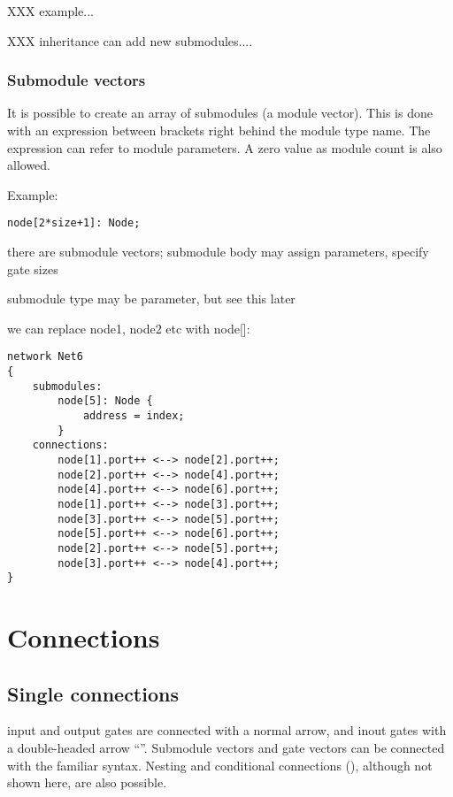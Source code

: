 XXX example...

XXX inheritance can add new submodules....

\subsubsection{Submodule vectors}

It is possible to create an array of
submodules (a module
vector).  This is done with an expression between
brackets right behind the module type name. The expression can refer
to module parameters. A zero value as module count is also allowed.

Example:

\begin{Verbatim}[commandchars=\\\{\}]
    node[2*size+1]: Node;
\end{Verbatim}

there are submodule vectors;
submodule body may assign parameters, specify gate sizes

submodule type may be parameter, but see this later

we can replace node1, node2 etc with node[]:

\begin{Verbatim}
network Net6
{
    submodules:
        node[5]: Node {
            address = index;
        }
    connections:
        node[1].port++ <--> node[2].port++;
        node[2].port++ <--> node[4].port++;
        node[4].port++ <--> node[6].port++;
        node[1].port++ <--> node[3].port++;
        node[3].port++ <--> node[5].port++;
        node[5].port++ <--> node[6].port++;
        node[2].port++ <--> node[5].port++;
        node[3].port++ <--> node[4].port++;
}
\end{Verbatim}


\section{Connections}

\subsection{Single connections}

input and output gates are connected with a normal arrow, and inout gates
with a double-headed arrow ``\ttt{<-->}''. Submodule vectors and gate
vectors can be connected with the familiar  syntax. Nesting and
conditional connections (), although not shown here, are also
possible.

